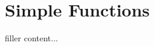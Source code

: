 \documentclass[../../templates/section]{subfiles}
\begin{document}
\section{Simple Functions}\label{sec:simple-functions}

filler content...
\end{document}

